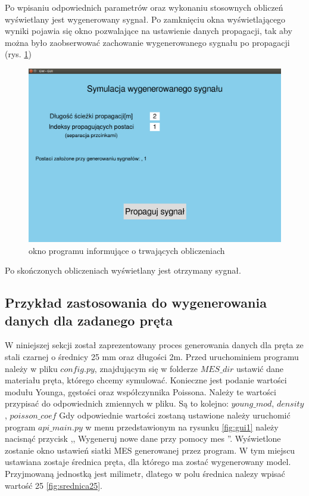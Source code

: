 Po wpisaniu odpowiednich parametrów oraz wykonaniu stosownych obliczeń wyświetlany jest wygenerowany sygnał. Po zamknięciu okna wyświetlającego wyniki pojawia się  okno pozwalające na ustawienie danych propagacji, tak aby można było zaobserwować zachowanie wygenerowanego sygnału po propagacji (rys. \ref{fig:guiLast2})

\begin{figure}[h]
\centering
\includegraphics[width=13cm]{Zdjecia/5/kasia/guiLast2}
\caption{okno programu informujące o trwających obliczeniach}
\label{fig:guiLast2}
\end{figure}

Po skończonych obliczeniach wyświetlany jest otrzymany sygnał.

\subsection{Przykład zastosowania do wygenerowania danych dla zadanego pręta}

W niniejszej sekcji został zaprezentowany proces generowania danych dla pręta ze stali czarnej o średnicy 25 mm oraz długości 2m. Przed uruchominiem programu należy w pliku $config.py$, znajdującym się w folderze $MES\_dir$ ustawić dane materiału pręta, którego chcemy symulować. Konieczne jest podanie wartości modułu Younga, gęstości oraz współczynnika Poissona. Należy te wartości przypisać do odpowiednich zmiennych w pliku. Są to kolejno: $young\_mod$, $density$, $poisson\_coef$ Gdy odpowiednie wartości zostaną ustawione należy uruchomić program $api\_main.py$ w menu przedstawionym na rysunku \ref{fig:gui1} należy nacisnąć przycisk ,, Wygeneruj nowe dane przy pomocy mes ''. Wyświetlone zostanie okno ustawień siatki MES generowanej przez program. W tym miejscu  ustawiana zostaje średnica pręta, dla którego ma zostać wygenerowany model. Przyjmowaną jednostką jest milimetr, dlatego w polu średnica nalezy wpisać wartość 25 \ref{fig:srednica25}.

